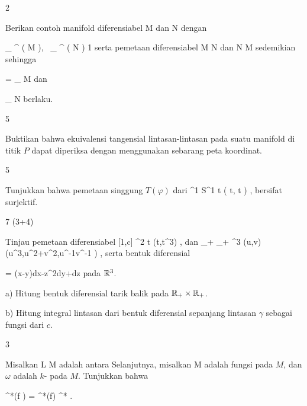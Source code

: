 {2}
{

Berikan contoh manifold diferensiabel
\mathkor {} {M} {dan} {N} {}
dengan

\mavergleichskette
{\vergleichskette
{ _{  } ^{  }  \left(   M   \right), \, _{  } ^{  }  \left(   N   \right)
}
{ \geq }{ 1
}
{  }{
}
{    }{
}
{   }{
}
}
{}{}{}
serta pemetaan diferensiabel
\maabb {\varphi} { M } { N
} {}
dan
\maabb {\psi} { N } { M
} {}
sedemikian sehingga

\mavergleichskette
{\vergleichskette
{ \psi \circ \varphi
}
{ = }{
_{ M }
}
{  }{
}
{    }{
}
{   }{
}
}
{}{}{}
dan

\mavergleichskette
{\vergleichskette
{\varphi \circ  \psi
}
{ \neq }{
_{ N }
}
{  }{
}
{    }{
}
{   }{
}
}
{}{}{}
berlaku.

}
{} {}

{5}
{

Buktikan bahwa ekuivalensi tangensial lintasan-lintasan pada suatu manifold di titik $P$ dapat diperiksa dengan menggunakan sebarang peta koordinat.

}
{} {}

{5}
{

Tunjukkan bahwa pemetaan singgung $T(\varphi)$ dari
\maabbeledisp {\varphi} {\R^1} {S^1
} { t } {( \cos  t, \sin  t  )
} {,}
bersifat surjektif.

}
{} {}

{7 (3+4)}
{

Tinjau pemetaan diferensiabel
\maabbeledisp {\gamma} { [1,c] } {\R^2
} { t } {(t,t^{3})
} {,}
 {} {}
dan
\maabbeledisp {\varphi} {\R_+ \times \R_+ } {\R^3
} {(u,v)} {(u^3,u^2+v^2,u^{-1}v^{-1} )
} {,}
serta bentuk diferensial

\mavergleichskettedisp
{\vergleichskette
{ \omega
}
{ =} { (x-y)dx-z^2dy+dz
}
{ } {
}
{ } {
}
{ } {
}
}
{}{}{}
pada ${\mathbb R}^3$.

a) Hitung bentuk diferensial tarik balik
\mathl{\varphi^* \omega}{} pada ${\mathbb R}_+ \times {\mathbb R}_+$.

b) Hitung integral lintasan dari bentuk diferensial
\mathl{\varphi^* \omega}{} sepanjang lintasan $\gamma$ sebagai fungsi dari $c$.

}
{} {}

{3}
{

Misalkan
\maabbdisp {\psi} { L } { M
} {}
adalah
antara
Selanjutnya, misalkan
 { M } {\R
} {}
adalah fungsi pada $M$, dan $\omega$ adalah
$k$-
pada $M$. Tunjukkan bahwa

\mavergleichskettedisp
{\vergleichskette
{ \psi^*(f \omega)
}
{ =} { \psi^*(f)  \psi^* \omega
}
{ } {
}
{ } {
}
{ } {
}
}
{}{}{.}

}
{} {}

